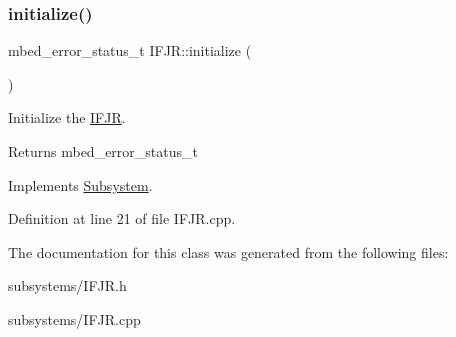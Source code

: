 \subsubsection{\texorpdfstring{initialize()}{initialize()}}
{\footnotesize\ttfamily mbed\+\_\+error\+\_\+status\+\_\+t I\+F\+J\+R\+::initialize (\begin{DoxyParamCaption}{ }\end{DoxyParamCaption})\hspace{0.3cm}{\ttfamily [virtual]}}



Initialize the \mbox{\hyperlink{class_i_f_j_r}{I\+F\+JR}}. 

\begin{DoxyReturn}{Returns}
mbed\+\_\+error\+\_\+status\+\_\+t 
\end{DoxyReturn}


Implements \mbox{\hyperlink{class_subsystem_afa43e7c1c8b49e514b944f517d4dc905}{Subsystem}}.



Definition at line 21 of file I\+F\+J\+R.\+cpp.



The documentation for this class was generated from the following files\+:\begin{DoxyCompactItemize}
\item 
subsystems/I\+F\+J\+R.\+h\item 
subsystems/I\+F\+J\+R.\+cpp\end{DoxyCompactItemize}
